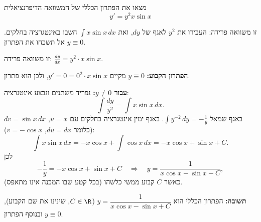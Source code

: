 
\begin{question}
מצאו את הפתרון הכללי של המשוואה הדיפרנציאלית
\[ y' = y^2 x \sin x \]
\end{question}

\begin{hint}
זו משוואה פרידה: העבירו את $y^2$ לאגף של $dy$, ואת $\int x\sin x\,dx$ חשבו באינטגרציה בחלקים. אל תשכחו את הפתרון $y \equiv 0$.
\end{hint}

\begin{solution}
זו משוואה פרידה: $\frac{dy}{dx} = y^2 \cdot x\sin x$.

\textbf{הפתרון הקבוע:} $y \equiv 0$ מקיים $y' = 0 = 0^2 \cdot x\sin x$, ולכן הוא פתרון.

\textbf{עבור $y \ne 0$:} נפריד משתנים ונבצע אינטגרציה:
\[ \int \frac{dy}{y^2} = \int x\sin x\,dx. \]
באגף שמאל $\int y^{-2}\,dy = -\frac{1}{y}$. באגף ימין אינטגרציה בחלקים עם $u = x$, $dv = \sin x\,dx$ (כלומר $du = dx$, $v = -\cos x$):
\[ \int x\sin x\,dx = -x\cos x + \int \cos x\,dx = -x\cos x + \sin x + C. \]
לכן
\[ -\frac{1}{y} = -x\cos x + \sin x + C \quad\Longrightarrow\quad \boxed{y = \frac{1}{x\cos x - \sin x - C}}, \]
כאשר $C$ קבוע ממשי כלשהו (בכל קטע שבו המכנה אינו מתאפס).

\textbf{תשובה:} הפתרון הכללי הוא $y = \dfrac{1}{x\cos x - \sin x + C}$ ($C \in \R$, שינינו את שם הקבוע), ובנוסף הפתרון $y \equiv 0$.
\end{solution}
